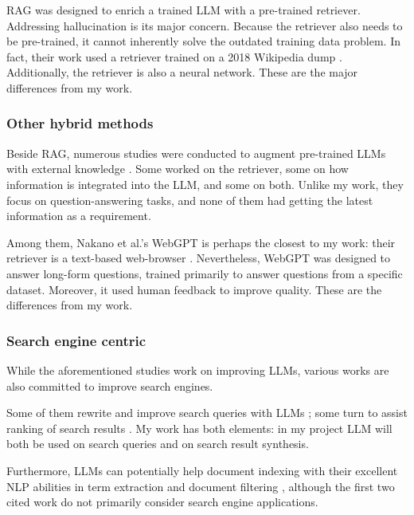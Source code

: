 \documentclass[final-report]{report-template}
\begin{document}
RAG was designed to enrich a trained LLM with a pre-trained retriever.
Addressing hallucination is its major concern. Because the retriever also
needs to be pre-trained, it cannot inherently solve the outdated training data
problem. In fact, their work used a retriever trained on a 2018 Wikipedia dump
\cite[Section 3]{rag}. Additionally, the retriever is also a neural network.
These are the major differences from my work.

\subsubsection{Other hybrid methods}
Beside RAG, numerous studies were conducted to augment pre-trained LLMs with
external knowledge \cite{hybrid.method.1, hybrid.method.2, hybrid.method.3,
hybrid.method.4, webgpt}.
Some worked on the retriever, some on how information is integrated into the
LLM, and some on both. Unlike my work, they focus on question-answering
tasks, and none of them had getting the latest information as a requirement.

Among them, Nakano et al.'s WebGPT is perhaps the closest to my work: their
retriever is a text-based web-browser \cite{webgpt}. Nevertheless, WebGPT was
designed to answer long-form questions, trained primarily to answer questions
from a specific dataset. Moreover, it used human feedback to improve quality.
These are the differences from my work.

\subsubsection{Search engine centric}
While the aforementioned studies work on improving LLMs, various works are also
committed to improve search engines. 

Some of them rewrite and improve search queries with LLMs
\cite{query.rewriting.1, query.rewriting.2}; some turn to assist ranking of
search results \cite{search.result.rerank.1, search.result.rerank.1}. My work
has both elements: in my project LLM will both be used on search queries and
on search result synthesis.

Furthermore, LLMs can potentially help document indexing with their excellent
NLP abilities in term extraction \cite{llm.term.extraction.1,
llm.term.extraction.2} and document filtering \cite{llm.indexing.filter},
although the first two cited work do not primarily consider search engine
applications. 
\end{document}
